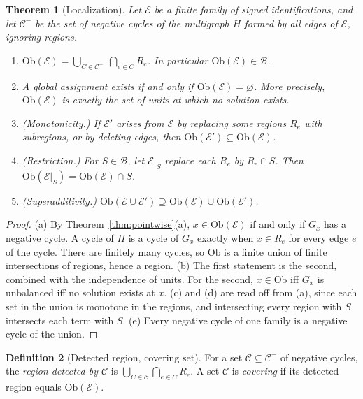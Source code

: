 \documentclass[11pt]{article}
\theoremstyle{plain}
\newtheorem{theorem}{Theorem}
\theoremstyle{definition}
\newtheorem{definition}[theorem]{Definition}
\theoremstyle{remark}
\newcommand{\Ob}{\mathrm{Ob}}
\begin{document}
\begin{theorem}[Localization]\label{thm:loc}
Let $\mathcal E$ be a finite family of signed identifications, and let $\mathcal C^-$ be the set of negative cycles of the multigraph $H$ formed by all edges of $\mathcal E$, ignoring regions.
\begin{enumerate}[label=(\alph*)]
\item $\displaystyle \Ob(\mathcal E)=\bigcup_{C\in\mathcal C^-}\ \bigcap_{e\in C}R_e$. In particular $\Ob(\mathcal E)\in\mathcal B$.
\item A global assignment exists if and only if $\Ob(\mathcal E)=\varnothing$. More precisely, $\Ob(\mathcal E)$ is exactly the set of units at which no solution exists.
\item (\emph{Monotonicity.}) If $\mathcal E'$ arises from $\mathcal E$ by replacing some regions $R_e$ with subregions, or by deleting edges, then $\Ob(\mathcal E')\subseteq\Ob(\mathcal E)$.
\item (\emph{Restriction.}) For $S\in\mathcal B$, let $\mathcal E|_S$ replace each $R_e$ by $R_e\cap S$. Then $\Ob(\mathcal E|_S)=\Ob(\mathcal E)\cap S$.
\item (\emph{Superadditivity.}) $\Ob(\mathcal E\cup\mathcal E')\supseteq\Ob(\mathcal E)\cup\Ob(\mathcal E')$.
\end{enumerate}
\end{theorem}

\begin{proof}
(a) By Theorem~\ref{thm:pointwise}(a), $x\in\Ob(\mathcal E)$ if and only if $G_x$ has a negative cycle. A cycle of $H$ is a cycle of $G_x$ exactly when $x\in R_e$ for every edge $e$ of the cycle. There are finitely many cycles, so $\Ob$ is a finite union of finite intersections of regions, hence a region. (b) The first statement is the second, combined with the independence of units. For the second, $x\in\Ob$ iff $G_x$ is unbalanced iff no solution exists at $x$. (c) and (d) are read off from (a), since each set in the union is monotone in the regions, and intersecting every region with $S$ intersects each term with $S$. (e) Every negative cycle of one family is a negative cycle of the union.
\end{proof}

\begin{definition}[Detected region, covering set]
For a set $\mathcal C\subseteq\mathcal C^-$ of negative cycles, the \emph{region detected by $\mathcal C$} is $\bigcup_{C\in\mathcal C}\bigcap_{e\in C}R_e$. A set $\mathcal C$ is \emph{covering} if its detected region equals $\Ob(\mathcal E)$.
\end{definition}
\end{document}
